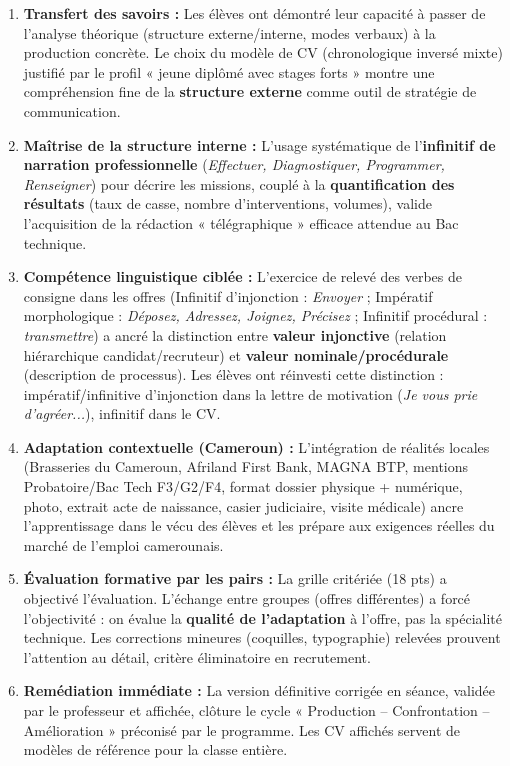 \documentclass[11pt]{article}
\begin{document}
\begin{enumerate}
    \item \textbf{Transfert des savoirs :} Les élèves ont démontré leur capacité à passer de l'analyse théorique (structure externe/interne, modes verbaux) à la production concrète. Le choix du modèle de CV (chronologique inversé mixte) justifié par le profil « jeune diplômé avec stages forts » montre une compréhension fine de la \textbf{structure externe} comme outil de stratégie de communication.
    \item \textbf{Maîtrise de la structure interne :} L'usage systématique de l'\textbf{infinitif de narration professionnelle} (\emph{Effectuer, Diagnostiquer, Programmer, Renseigner}) pour décrire les missions, couplé à la \textbf{quantification des résultats} (taux de casse, nombre d'interventions, volumes), valide l'acquisition de la rédaction « télégraphique » efficace attendue au Bac technique.
    \item \textbf{Compétence linguistique ciblée :} L'exercice de relevé des verbes de consigne dans les offres (Infinitif d'injonction : \emph{Envoyer} ; Impératif morphologique : \emph{Déposez, Adressez, Joignez, Précisez} ; Infinitif procédural : \emph{transmettre}) a ancré la distinction entre \textbf{valeur injonctive} (relation hiérarchique candidat/recruteur) et \textbf{valeur nominale/procédurale} (description de processus). Les élèves ont réinvesti cette distinction : impératif/infinitive d'injonction dans la lettre de motivation (\emph{Je vous prie d'agréer...}), infinitif dans le CV.
    \item \textbf{Adaptation contextuelle (Cameroun) :} L'intégration de réalités locales (Brasseries du Cameroun, Afriland First Bank, MAGNA BTP, mentions Probatoire/Bac Tech F3/G2/F4, format dossier physique + numérique, photo, extrait acte de naissance, casier judiciaire, visite médicale) ancre l'apprentissage dans le vécu des élèves et les prépare aux exigences réelles du marché de l'emploi camerounais.
    \item \textbf{Évaluation formative par les pairs :} La grille critériée (18 pts) a objectivé l'évaluation. L'échange entre groupes (offres différentes) a forcé l'objectivité : on évalue la \textbf{qualité de l'adaptation} à l'offre, pas la spécialité technique. Les corrections mineures (coquilles, typographie) relevées prouvent l'attention au détail, critère éliminatoire en recrutement.
    \item \textbf{Remédiation immédiate :} La version définitive corrigée en séance, validée par le professeur et affichée, clôture le cycle « Production -- Confrontation -- Amélioration » préconisé par le programme. Les CV affichés servent de modèles de référence pour la classe entière.
\end{enumerate}
\end{document}
